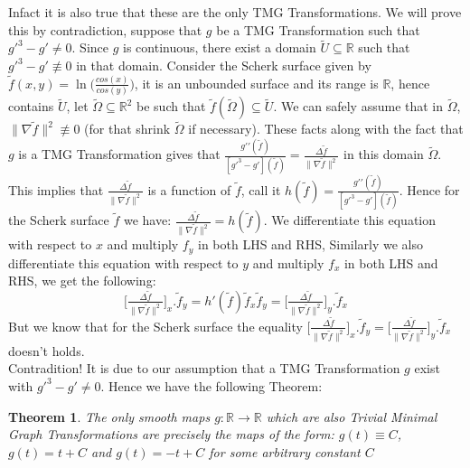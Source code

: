 \documentclass[12pt]{article}
\theoremstyle{plain}
\newtheorem{theorem}{Theorem}[section]
\theoremstyle{definition}
\theoremstyle{remark}
\begin{document}
	Infact it is also true that these are the only TMG Transformations. We will prove this by contradiction, suppose that \(g\) be a TMG Transformation such that \(g\prime^3-g\prime \neq 0\). Since \(g\) is continuous, there exist a domain \(\tilde U\subseteq \mathbb{R}\) such that \(g\prime^3-g\prime \not\equiv 0\) in that domain. Consider the Scherk surface given by \(\tilde f(x,y)=\ln\big(\tfrac{cos(x)}{cos(y)}\big)\), it is an unbounded surface and its range is \(\mathbb{R}\), hence contains \(\tilde U\), let \(\tilde \Omega\subseteq\mathbb{R}^2\) be such that \(\tilde f(\tilde \Omega)\subseteq\tilde U\). We can safely assume that in \(\tilde \Omega\), \(\|\nabla \tilde f\|^2 \not\equiv 0\) (for that shrink \(\tilde \Omega\) if necessary). These facts along with the fact that \(g\) is a TMG Transformation gives that \(\tfrac{g\prime\prime(\tilde f)}{[g\prime^3-g\prime](\tilde f)}=\tfrac{\Delta \tilde f}{\|\nabla \tilde f\|^2}\) in this domain \(\tilde \Omega\). This implies that \(\tfrac{\Delta \tilde f}{\|\nabla \tilde f\|^2}\) is a function of \(\tilde f\), call it \(h(\tilde f)=\tfrac{g\prime\prime(\tilde f)}{[g\prime^3-g\prime](\tilde f)}\). Hence for the Scherk surface \(\tilde f\) we have:  \(\tfrac{\Delta \tilde f}{\|\nabla \tilde f\|^2}=h(\tilde f)\). We differentiate this equation with respect to \(x\) and multiply \(f_y\) in both LHS and RHS, Similarly we also differentiate this equation with respect to \(y\) and multiply \(f_x\) in both LHS and RHS, we get the following:
	\begin{equation}
		\Big[\tfrac{\Delta \tilde f}{\|\nabla \tilde f\|^2}\Big]_x.\tilde f_y=h'(\tilde f) \tilde f_x \tilde f_y=\Big[\tfrac{\Delta \tilde f}{\|\nabla \tilde f\|^2}\Big]_y.\tilde f_x
	\end{equation}
	But we know that for the Scherk surface the equality \(\Big[\tfrac{\Delta \tilde f}{\|\nabla \tilde f\|^2}\Big]_x.\tilde f_y=\Big[\tfrac{\Delta \tilde f}{\|\nabla \tilde f\|^2}\Big]_y.\tilde f_x\) doesn't holds.\\
	Contradition! It is due to our assumption that a TMG Transformation \(g\) exist with \(g\prime^3-g\prime \neq 0\). Hence we have the following Theorem: 
	\begin{theorem}
		\label{thm: Trivial MGT}
		The only smooth maps \(g:\mathbb{R}\longrightarrow\mathbb{R}\) which are also Trivial Minimal Graph Transformations are precisely the maps of the form: \(g(t)\equiv C\), \(g(t)=t+C\) and \(g(t)=-t+C\) for some arbitrary constant \(C\)
	\end{theorem}
    
\end{document}
